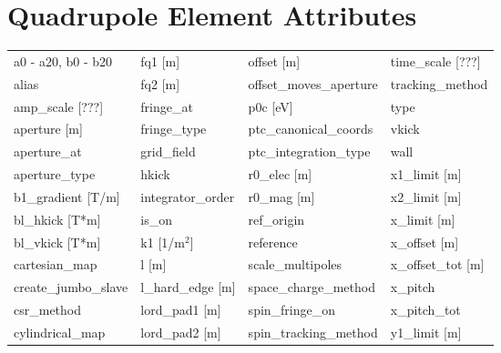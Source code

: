  \section{Quadrupole Element Attributes}
 \label{s:list.quadrupole}
 
 \begin{tabular}{llll} \toprule
a0 - a20, b0 - b20             & fq1 [m]                        & offset [m]                     & time_scale [???]               \\
alias                          & fq2 [m]                        & offset_moves_aperture          & tracking_method                \\
amp_scale [???]                & fringe_at                      & p0c [eV]                       & type                           \\
aperture [m]                   & fringe_type                    & ptc_canonical_coords           & vkick                          \\
aperture_at                    & grid_field                     & ptc_integration_type           & wall                           \\
aperture_type                  & hkick                          & r0_elec [m]                    & x1_limit [m]                   \\
b1_gradient [T/m]              & integrator_order               & r0_mag [m]                     & x2_limit [m]                   \\
bl_hkick [T*m]                 & is_on                          & ref_origin                     & x_limit [m]                    \\
bl_vkick [T*m]                 & k1 [1/m$^2$]                   & reference                      & x_offset [m]                   \\
cartesian_map                  & l [m]                          & scale_multipoles               & x_offset_tot [m]               \\
create_jumbo_slave             & l_hard_edge [m]                & space_charge_method            & x_pitch                        \\
csr_method                     & lord_pad1 [m]                  & spin_fringe_on                 & x_pitch_tot                    \\
cylindrical_map                & lord_pad2 [m]                  & spin_tracking_method           & y1_limit [m]                   \\

\end{tabular}
